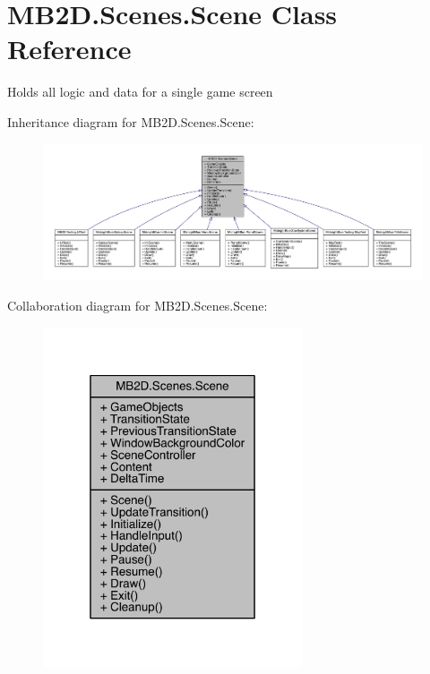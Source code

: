 \hypertarget{class_m_b2_d_1_1_scenes_1_1_scene}{}\section{M\+B2\+D.\+Scenes.\+Scene Class Reference}
\label{class_m_b2_d_1_1_scenes_1_1_scene}


Holds all logic and data for a single game screen  




Inheritance diagram for M\+B2\+D.\+Scenes.\+Scene\+:\nopagebreak
\begin{figure}[H]
\begin{center}
\leavevmode
\includegraphics[width=350pt]{class_m_b2_d_1_1_scenes_1_1_scene__inherit__graph}
\end{center}
\end{figure}


Collaboration diagram for M\+B2\+D.\+Scenes.\+Scene\+:\nopagebreak
\begin{figure}[H]
\begin{center}
\leavevmode
\includegraphics[width=217pt]{class_m_b2_d_1_1_scenes_1_1_scene__coll__graph}
\end{center}
\end{figure}
